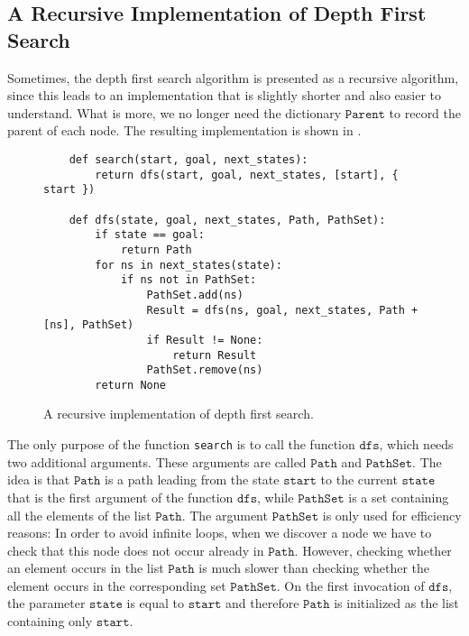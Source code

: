 \subsection{A Recursive Implementation of Depth First Search}
Sometimes, the depth first search algorithm is presented as a recursive algorithm, since this leads
to an implementation that is slightly shorter and also easier to understand.  What is more, we no
longer need the dictionary $\texttt{Parent}$ to record the parent of each node.  The resulting
implementation is shown in .

\begin{figure}[!ht]
\centering
\begin{verbatim}
    def search(start, goal, next_states):
        return dfs(start, goal, next_states, [start], { start })
    
    def dfs(state, goal, next_states, Path, PathSet):
        if state == goal:
            return Path
        for ns in next_states(state):
            if ns not in PathSet:
                PathSet.add(ns)
                Result = dfs(ns, goal, next_states, Path + [ns], PathSet)
                if Result != None:
                    return Result
                PathSet.remove(ns)
        return None
\end{verbatim}
\vspace*{-0.3cm}
\caption{A recursive implementation of depth first search.}
\label{fig:Depth-First-Search.ipynb}
\end{figure}
The only purpose of the function \texttt{search} is to call the function $\texttt{dfs}$, which needs two
additional arguments.  These arguments are called $\texttt{Path}$ and $\texttt{PathSet}$.  The idea is that $\texttt{Path}$ is
a path leading from the state $\texttt{start}$ to the current $\texttt{state}$ that is the first
argument of the function $\texttt{dfs}$, while $\texttt{PathSet}$ is a set containing all the elements of the
list $\texttt{Path}$.  The argument $\texttt{PathSet}$ is only used for efficiency reasons:  In order to avoid
infinite loops, when we discover a node we have to check that this node does not occur already in $\texttt{Path}$.
However, checking whether an element occurs in the list $\texttt{Path}$ is much slower than checking whether
the element occurs in the corresponding set $\texttt{PathSet}$.  On the first invocation of $\texttt{dfs}$, the
parameter $\texttt{state}$ is equal to $\texttt{start}$ and therefore $\texttt{Path}$ is initialized
as the list containing only $\texttt{start}$.

